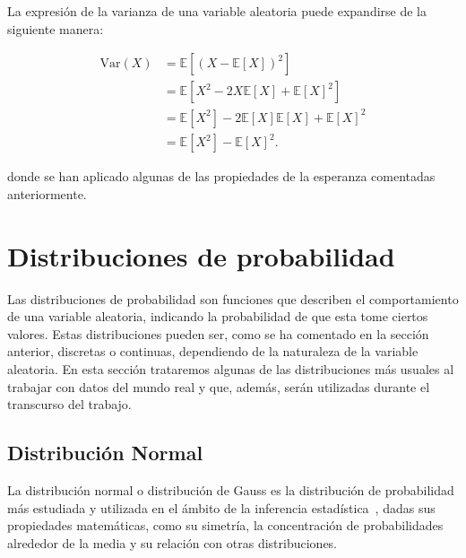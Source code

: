 \begin{observacion}
    La expresión de la varianza de una variable aleatoria puede expandirse de la siguiente manera:

    \begin{align*}
        \text{Var}(X) &= \mathbb{E}[{(X - \mathbb{E}[X])}^2] \\
        &= \mathbb{E}[X^2 - 2X\mathbb{E}[X] + \mathbb{E}{[X]}^2] \\
        &=  \mathbb{E}[X^2] - 2\mathbb{E}[X]\mathbb{E}[X] + \mathbb{E}{[X]}^2 \\
        &= \mathbb{E}[X^2]  - \mathbb{E}{[X]}^2.
    \end{align*}

    donde se han aplicado algunas de las propiedades de la esperanza comentadas anteriormente.\newline
\end{observacion}

\section{Distribuciones de probabilidad}

Las distribuciones de probabilidad son funciones que describen el comportamiento de una variable aleatoria, indicando la probabilidad de que esta tome ciertos valores. Estas distribuciones pueden ser, como se ha comentado en la sección anterior, discretas o continuas, dependiendo de la naturaleza de la variable aleatoria. En esta sección trataremos algunas de las distribuciones más usuales al trabajar con datos del mundo real y que, además, serán utilizadas durante el transcurso del trabajo.\newline

\subsection{Distribución Normal}
La distribución normal o distribución de Gauss es la distribución de probabilidad más estudiada y utilizada en el ámbito de la inferencia estadística~\cite{Bryc1995TheND}, dadas sus propiedades matemáticas, como su simetría, la concentración de probabilidades alrededor de la media y su relación con otras distribuciones.\newline

